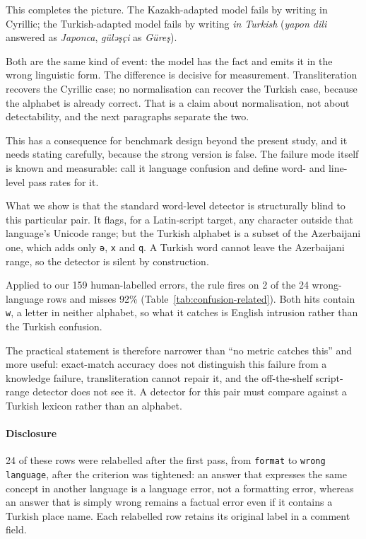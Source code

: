 \documentclass[final]{clv2025}
\begin{document}
This completes the picture. The Kazakh-adapted model fails by writing in
Cyrillic; the Turkish-adapted model fails by writing \emph{in Turkish}
(\emph{yapon dili} answered as \emph{Japonca}, \emph{güləşçi} as \emph{Güreş}).

Both are the same kind of event: the model has the fact and emits it in the
wrong linguistic form. The difference is decisive for measurement.
Transliteration recovers the Cyrillic case; no normalisation can recover the
Turkish case, because the alphabet is already correct. That is a claim about
normalisation, not about detectability, and the next paragraphs separate the
two.

This has a consequence for benchmark design beyond the present study, and it
needs stating carefully, because the strong version is false. The failure mode
itself is known and measurable:  call it
language confusion and define word- and line-level pass rates for it.

What we show is that the standard word-level detector is structurally blind to
this particular pair. It flags, for a Latin-script target, any character
outside that language's Unicode range; but the Turkish alphabet is a subset of
the Azerbaijani one, which adds only \texttt{ə}, \texttt{x} and \texttt{q}. A
Turkish word cannot leave the Azerbaijani range, so the detector is silent by
construction.

Applied to our 159 human-labelled errors, the rule fires on 2 of the 24
wrong-language rows and misses 92\% (Table~\ref{tab:confusion-related}). Both
hits contain \texttt{w}, a letter in neither alphabet, so what it catches is
English intrusion rather than the Turkish confusion.

The practical statement is therefore narrower than ``no metric catches this''
and more useful: exact-match accuracy does not distinguish this failure from a
knowledge failure, transliteration cannot repair it, and the off-the-shelf
script-range detector does not see it. A detector for this pair must compare
against a Turkish lexicon rather than an alphabet.

\paragraph{Disclosure} 24 of these rows were relabelled after the first pass,
from \texttt{format} to \texttt{wrong language}, after the criterion was
tightened: an answer that expresses the same concept in another language is a
language error, not a formatting error, whereas an answer that is simply wrong
remains a factual error even if it contains a Turkish place name. Each
relabelled row retains its original label in a comment field.
\end{document}
